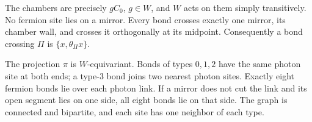 \begin{proposition}\label{prop:reg-geometry}
The chambers are precisely $gC_0$, $g\in W$, and $W$ acts on them
simply transitively. No fermion site lies on a mirror. Every bond
crosses exactly one mirror, its chamber wall, and crosses it
orthogonally at its midpoint. Consequently a bond crossing $\Pi$ is
$\{x,\theta_\Pi x\}$.

The projection $\pi$ is $W$-equivariant. Bonds of types $0,1,2$ have
the same photon site at both ends; a type-$3$ bond joins two nearest
photon sites. Exactly eight fermion bonds lie over each photon link.
If a mirror does not cut the link and its open segment lies on one
side, all eight bonds lie on that side.
The graph is connected and bipartite, and each site has one neighbor
of each type.
\end{proposition}

